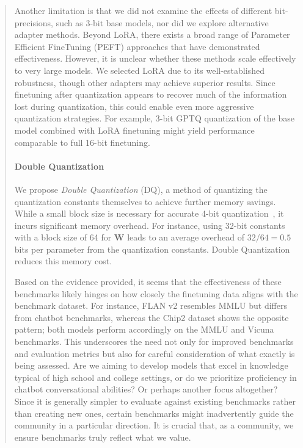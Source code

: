 \begin{quote}
Another limitation is that we did not examine the effects of different bit-precisions, such as 3-bit base models, nor did we explore alternative adapter methods. Beyond LoRA, there exists a broad range of Parameter Efficient FineTuning (PEFT) approaches that have demonstrated effectiveness. However, it is unclear whether these methods scale effectively to very large models. We selected LoRA due to its well-established robustness, though other adapters may achieve superior results. Since finetuning after quantization appears to recover much of the information lost during quantization, this could enable even more aggressive quantization strategies. For example, 3-bit GPTQ quantization of the base model combined with LoRA finetuning might yield performance comparable to full 16-bit finetuning.

\paragraph{Double Quantization{}}
We propose \emph{Double Quantization} (DQ), a method of quantizing the quantization constants themselves to achieve further memory savings. While a small block size is necessary for accurate 4-bit quantization~\citep{dettmers2022case}, it incurs significant memory overhead. For instance, using 32-bit constants with a block size of 64 for $\mathbf{W}$ leads to an average overhead of $32/64 = 0.5$ bits per parameter from the quantization constants. Double Quantization reduces this memory cost.

Based on the evidence provided, it seems that the effectiveness of these benchmarks likely hinges on how closely the finetuning data aligns with the benchmark dataset. For instance, FLAN v2 resembles MMLU but differs from chatbot benchmarks, whereas the Chip2 dataset shows the opposite pattern; both models perform accordingly on the MMLU and Vicuna benchmarks. This underscores the need not only for improved benchmarks and evaluation metrics but also for careful consideration of what exactly is being assessed. Are we aiming to develop models that excel in knowledge typical of high school and college settings, or do we prioritize proficiency in chatbot conversational abilities? Or perhaps another focus altogether? Since it is generally simpler to evaluate against existing benchmarks rather than creating new ones, certain benchmarks might inadvertently guide the community in a particular direction. It is crucial that, as a community, we ensure benchmarks truly reflect what we value.


\end{quote}
